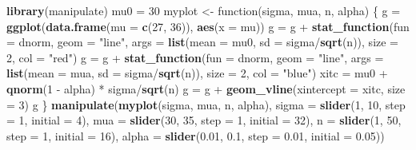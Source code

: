 \documentclass[]{article}
\newenvironment{Shaded}{\begin{snugshade}}{\end{snugshade}}
\newcommand{\KeywordTok}[1]{\textcolor[rgb]{0.13,0.29,0.53}{\textbf{{#1}}}}
\newcommand{\DataTypeTok}[1]{\textcolor[rgb]{0.13,0.29,0.53}{{#1}}}
\newcommand{\DecValTok}[1]{\textcolor[rgb]{0.00,0.00,0.81}{{#1}}}
\newcommand{\FloatTok}[1]{\textcolor[rgb]{0.00,0.00,0.81}{{#1}}}
\newcommand{\StringTok}[1]{\textcolor[rgb]{0.31,0.60,0.02}{{#1}}}
\newcommand{\NormalTok}[1]{{#1}}
\begin{document}
\begin{Shaded}
\begin{Highlighting}[]
\KeywordTok{library}\NormalTok{(manipulate)}
\NormalTok{mu0 =}\StringTok{ }\DecValTok{30}
\NormalTok{myplot <-}\StringTok{ }\NormalTok{function(sigma, mua, n, alpha) \{}
    \NormalTok{g =}\StringTok{ }\KeywordTok{ggplot}\NormalTok{(}\KeywordTok{data.frame}\NormalTok{(}\DataTypeTok{mu =} \KeywordTok{c}\NormalTok{(}\DecValTok{27}\NormalTok{, }\DecValTok{36}\NormalTok{)), }\KeywordTok{aes}\NormalTok{(}\DataTypeTok{x =} \NormalTok{mu))}
    \NormalTok{g =}\StringTok{ }\NormalTok{g +}\StringTok{ }\KeywordTok{stat_function}\NormalTok{(}\DataTypeTok{fun =} \NormalTok{dnorm, }\DataTypeTok{geom =} \StringTok{"line"}\NormalTok{,}
                          \DataTypeTok{args =} \KeywordTok{list}\NormalTok{(}\DataTypeTok{mean =} \NormalTok{mu0,}
        \DataTypeTok{sd =} \NormalTok{sigma/}\KeywordTok{sqrt}\NormalTok{(n)), }\DataTypeTok{size =} \DecValTok{2}\NormalTok{, }\DataTypeTok{col =} \StringTok{"red"}\NormalTok{)}
    \NormalTok{g =}\StringTok{ }\NormalTok{g +}\StringTok{ }\KeywordTok{stat_function}\NormalTok{(}\DataTypeTok{fun =} \NormalTok{dnorm, }\DataTypeTok{geom =} \StringTok{"line"}\NormalTok{,}
                          \DataTypeTok{args =} \KeywordTok{list}\NormalTok{(}\DataTypeTok{mean =} \NormalTok{mua,}
        \DataTypeTok{sd =} \NormalTok{sigma/}\KeywordTok{sqrt}\NormalTok{(n)), }\DataTypeTok{size =} \DecValTok{2}\NormalTok{, }\DataTypeTok{col =} \StringTok{"blue"}\NormalTok{)}
    \NormalTok{xitc =}\StringTok{ }\NormalTok{mu0 +}\StringTok{ }\KeywordTok{qnorm}\NormalTok{(}\DecValTok{1} \NormalTok{-}\StringTok{ }\NormalTok{alpha) *}\StringTok{ }\NormalTok{sigma/}\KeywordTok{sqrt}\NormalTok{(n)}
    \NormalTok{g =}\StringTok{ }\NormalTok{g +}\StringTok{ }\KeywordTok{geom_vline}\NormalTok{(}\DataTypeTok{xintercept =} \NormalTok{xitc, }\DataTypeTok{size =} \DecValTok{3}\NormalTok{)}
    \NormalTok{g}
\NormalTok{\}}
\KeywordTok{manipulate}\NormalTok{(}\KeywordTok{myplot}\NormalTok{(sigma, mua, n, alpha),}
           \DataTypeTok{sigma =} \KeywordTok{slider}\NormalTok{(}\DecValTok{1}\NormalTok{, }\DecValTok{10}\NormalTok{, }\DataTypeTok{step =} \DecValTok{1}\NormalTok{, }\DataTypeTok{initial =} \DecValTok{4}\NormalTok{),}
    \DataTypeTok{mua =} \KeywordTok{slider}\NormalTok{(}\DecValTok{30}\NormalTok{, }\DecValTok{35}\NormalTok{, }\DataTypeTok{step =} \DecValTok{1}\NormalTok{, }\DataTypeTok{initial =} \DecValTok{32}\NormalTok{),}
    \DataTypeTok{n =} \KeywordTok{slider}\NormalTok{(}\DecValTok{1}\NormalTok{, }\DecValTok{50}\NormalTok{, }\DataTypeTok{step =} \DecValTok{1}\NormalTok{, }\DataTypeTok{initial =} \DecValTok{16}\NormalTok{),}
    \DataTypeTok{alpha =} \KeywordTok{slider}\NormalTok{(}\FloatTok{0.01}\NormalTok{, }\FloatTok{0.1}\NormalTok{, }\DataTypeTok{step =} \FloatTok{0.01}\NormalTok{, }\DataTypeTok{initial =} \FloatTok{0.05}\NormalTok{))}
\end{Highlighting}
\end{Shaded}
\end{document}
